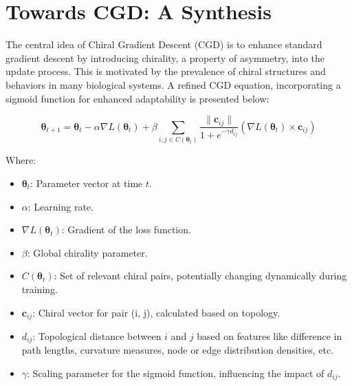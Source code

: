 \documentclass[12pt, a4paper]{article}
\begin{document}
\section{Towards CGD: A Synthesis}

The central idea of Chiral Gradient Descent (CGD) is to enhance standard gradient descent by introducing chirality, a property of asymmetry, into the update process.  This is motivated by the prevalence of chiral structures and behaviors in many biological systems.  A refined CGD equation, incorporating a sigmoid function for enhanced adaptability is presented below:

\begin{equation} \label{eq:cgd_sigmoid_final}
\boldsymbol{\theta}_{t+1} = \boldsymbol{\theta}_t - \alpha \nabla L(\boldsymbol{\theta}_t) + \beta \sum_{i,j \in C(\boldsymbol{\theta}_t)}  \frac{\| \mathbf{c}_{ij} \|}{1 + e^{-\gamma d_{ij}}} (\nabla L(\boldsymbol{\theta}_t) \times \mathbf{c}_{ij})
\end{equation}

Where:

\begin{itemize}
    \item \(\boldsymbol{\theta}_t\): Parameter vector at time \(t\).
    \item \(\alpha\): Learning rate.
    \item \(\nabla L(\boldsymbol{\theta}_t)\): Gradient of the loss function.
    \item \(\beta\): Global chirality parameter.
    \item \(C(\boldsymbol{\theta}_t)\): Set of relevant chiral pairs, potentially changing dynamically during training.
    \item \(\mathbf{c}_{ij}\): Chiral vector for pair (i, j), calculated based on topology.
    \item \(d_{ij}\): Topological distance between \(i\) and \(j\) based on features like difference in path lengths, curvature measures, node or edge distribution densities, etc.
    \item \(\gamma\): Scaling parameter for the sigmoid function, influencing the impact of \(d_{ij}\).
\end{itemize}
\end{document}

